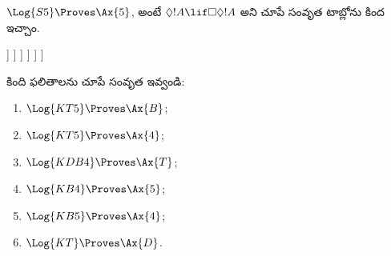 \documentclass[../../../include/open-logic-section]{subfiles}
\begin{document}
\begin{ex}
  $\Log{S5} \Proves \Ax{5}$, అంటే
  $\Diamond!A \lif \Box\Diamond!A$ అని చూపే సంవృత
  టాబ్లోను కింద ఇచ్చాం.
  \begin{oltableau}
    [\pFmla{\False}{\Diamond\formula{A} \lif \Box\Diamond \formula{A}}{1},
      just = \TAss
      [\pFmla{\True}{\Diamond \formula{A}}{1}, just = {\TRule{\False}{\lif}[1]}
        [\pFmla{\False}{\Box\Diamond \formula{A}}{1},
          just = {\TRule{\False}{\lif}[1]}
          [\pFmla{\False}{\Diamond \formula{A}}{1.1},
            just = {\TRule{\False}{\Box}[3]}
            [\pFmla{\False}{\Diamond \formula{A}}{1},
              just = {4r$\Diamond$ 4}
              [\pFmla{\True}{\formula{A}}{1.2},
                just = {\TRule{\True}{\Diamond}[2]}
                [\pFmla{\False}{\formula{A}}{1.2},
                  just = {\TRule{\False}{\Diamond}[5]}, close]
              ]
            ]
          ]
        ]
      ]
    ]
  \end{oltableau}
\end{ex}

\begin{prob}
కింది ఫలితాలను చూపే సంవృత  ఇవ్వండి:
  \begin{enumerate}
  \item $\Log{KT5} \Proves \Ax{B}$;
  \item $\Log{KT5} \Proves \Ax{4}$;
  \item $\Log{KDB4} \Proves \Ax{T}$;
  \item $\Log{KB4} \Proves \Ax{5}$;
  \item $\Log{KB5} \Proves \Ax{4}$;
  \item $\Log{KT} \Proves \Ax{D}$.
  \end{enumerate}
\end{prob}
\end{document}

